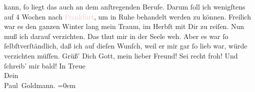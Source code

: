                kann, ſo liegt das auch an dem anſtregenden Berufe. Darum ſoll ich wenigſtens auf 4
               Wochen nach \textcolor{pink}{Frankfurt}{}\ledrightnote{\textcolor{pink}{Frankfurt am Main}}, um in Ruhe behandelt
               werden zu können. Freilich war es den ganzen Winter lang mein Traum, im Herbſt mit
               Dir zu reiſen. Nun muß ich darauf verzichten. Das thut mir in der Seele {\pb}weh. Aber es war ſo ſelbſtverſtändlich, daß ich auf
               dieſen Wunſch, weil er mir gar ſo lieb war, würde verzichten müſſen.\pend
           \pstart
           Grüß’ Dich Gott, mein lieber Freund! Sei recht froh! Und ſchreib’ mir bald!\pend
           \pstart
           In Treue {\\[\baselineskip]}Dein {\\[\baselineskip]}\spacefill\mbox{Paul Goldmann.}\pend
           \leftskip=0em{}\endnumbering{}  
      